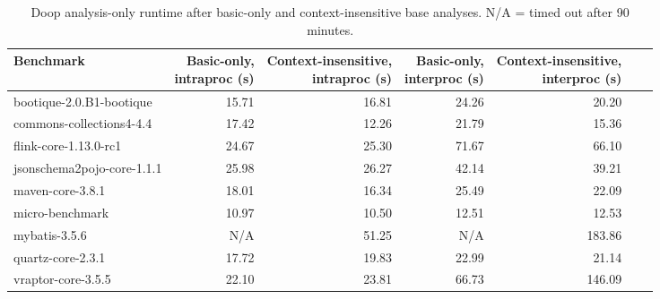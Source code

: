 \begin{table*}
	\centering
	\caption{Doop analysis-only runtime after basic-only and context-insensitive base analyses. N/A = timed out after 90 minutes.}
	\begin{tabular}{lrrrrrr}
		\toprule
		Benchmark & \thead{Basic-only, \\ intraproc (s)} & \thead{Context-insensitive, \\ intraproc (s)} & \thead{Basic-only, \\ interproc (s)}  & \thead{Context-insensitive, \\ interproc (s)}  \\
		\midrule
		bootique-2.0.B1-bootique           		& 15.71  & 16.81 &  24.26    &  20.20     \\
		commons-collections4-4.4           		& 17.42  & 12.26 &  21.79    &  15.36        \\
		flink-core-1.13.0-rc1           		& 24.67  & 25.30 &  71.67    &  66.10         \\
		jsonschema2pojo-core-1.1.1         		& 25.98  & 26.27 &  42.14    &  39.21         \\
		maven-core-3.8.1   		        	& 18.01  & 16.34 &  25.49    &  22.09          \\
		micro-benchmark         			& 10.97  & 10.50 &  12.51    &  12.53        \\
		mybatis-3.5.6         		  		&  N/A   & 51.25 &   N/A     & 183.86          \\
		quartz-core-2.3.1        	  		& 17.72  & 19.83 &  22.99    &  21.14        \\
		vraptor-core-3.5.5         	  		& 22.10  & 23.81 &  66.73    & 146.09       \\
		\bottomrule
	\end{tabular}
	\label{tab:doop-runtimes}
\end{table*}

